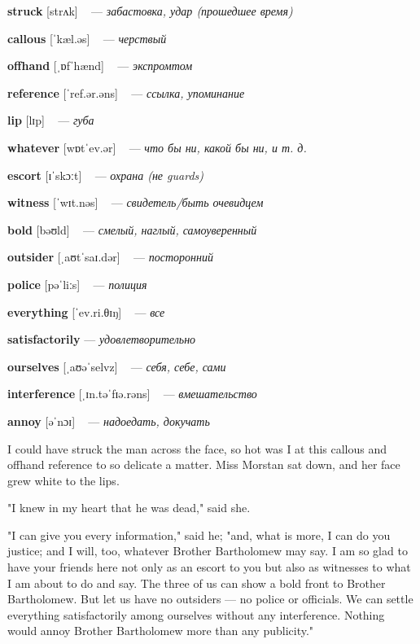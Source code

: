 \documentclass[a4paper,oneside,12pt]{amsart}
\begin{document}
{\large 

 {\bf struck } [strʌk] ~ --- \emph{ забастовка, удар (прошедшее время) }

{\bf callous } [ˈkæl.əs] ~ --- \emph{ черствый }

{\bf offhand } [ˌɒfˈhænd] ~ --- \emph{ экспромтом }

{\bf reference } [ˈref.ər.əns] ~ --- \emph{ ссылка, упоминание }

{\bf lip } [lɪp] ~ --- \emph{ губа }

{\bf whatever } [wɒtˈev.ər] ~ --- \emph{ что бы ни, какой бы ни, и т. д. }

{\bf escort } [ɪˈskɔːt] ~ --- \emph{ охрана (не guards) }

{\bf witness } [ˈwɪt.nəs] ~ --- \emph{ свидетель/быть очевидцем }

{\bf bold } [bəʊld] ~ --- \emph{ смелый, наглый, самоуверенный }

{\bf outsider } [ˌaʊtˈsaɪ.dər] ~ --- \emph{ посторонний }

{\bf police } [pəˈliːs] ~ --- \emph{ полиция }

{\bf everything } [ˈev.ri.θɪŋ] ~ --- \emph{ все }

{\bf satisfactorily } --- \emph{ удовлетворительно }

{\bf ourselves } [ˌaʊəˈselvz] ~ --- \emph{ себя, себе, сами }

{\bf interference } [ˌɪn.təˈfɪə.rəns] ~ --- \emph{ вмешательство }

{\bf annoy } [əˈnɔɪ] ~ --- \emph{ надоедать, докучать }

} \vspace{6mm} {\Large 

 
I could have struck the man across the face, so hot was I at this callous and offhand reference to so delicate a matter. Miss Morstan sat down, and her face grew white to the lips.

"I knew in my heart that he was dead," said she.

"I can give you every information," said he; "and, what is more, I can do you justice; and I will, too, whatever Brother Bartholomew may say. I am so glad to have your friends here not only as an escort to you but also as witnesses to what I am about to do and say. The three of us can show a bold front to Brother Bartholomew. But let us have no outsiders --- no police or officials. We can settle everything satisfactorily among ourselves without any interference. Nothing would annoy Brother Bartholomew more than any publicity."
\\ } 
\end{document}
